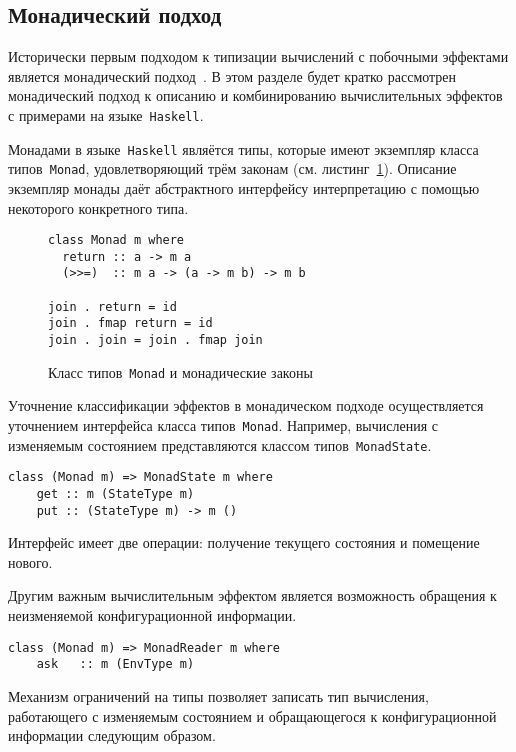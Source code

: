 \documentclass [a4paper] {article}
\begin{document}
\subsection{Монадический подход}

Исторически первым подходом к типизации вычислений с побочными эффектами
является монадический подход~\cite{Moggi:1989:CLM:77350.77353}. В этом разделе
будет кратко рассмотрен монадический подход к описанию и комбинированию
вычислительных эффектов с примерами на языке~\texttt{Haskell}.

Монадами в языке~\texttt{Haskell} являётся типы, которые имеют экземпляр 
класса типов~\texttt{Monad}, удовлетворяющий трём законам
(см. листинг~\ref{listing:monad}). Описание экземпляр монады даёт
абстрактного интерфейсу интерпретацию с помощью некоторого конкретного
типа.   

\begin{figure}[h]
\begin{verbatim}
class Monad m where
  return :: a -> m a
  (>>=)  :: m a -> (a -> m b) -> m b

join . return = id
join . fmap return = id
join . join = join . fmap join
\end{verbatim}
\caption{Класс типов~\texttt{Monad} и монадические законы}
\label{listing:monad}
\end{figure}

Уточнение классификации эффектов в монадическом подходе осуществляется
уточнением интерфейса класса типов~\texttt{Monad}. Например, вычисления с
изменяемым состоянием представляются классом типов~\texttt{MonadState}.

\begin{verbatim}
class (Monad m) => MonadState m where
    get :: m (StateType m)
    put :: (StateType m) -> m ()
\end{verbatim}

Интерфейс имеет две операции: получение текущего состояния и помещение
нового. 

Другим важным вычислительным эффектом является возможность обращения к
неизменяемой конфигурационной информации. 

\begin{verbatim}
class (Monad m) => MonadReader m where
    ask   :: m (EnvType m)
\end{verbatim}

Механизм ограничений на типы позволяет записать тип вычисления, работающего
с изменяемым состоянием и обращающегося к конфигурационной информации следующим
образом. 
\end{document}
